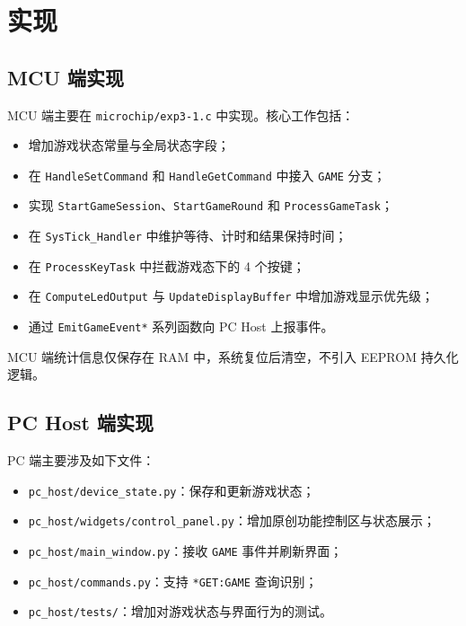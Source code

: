 \documentclass[main.tex]{subfiles}
\begin{document}
\section{实现}

\subsection{MCU 端实现}

MCU 端主要在 \texttt{microchip/exp3-1.c} 中实现。核心工作包括：

\begin{itemize}[leftmargin=2em]
  \item 增加游戏状态常量与全局状态字段；
  \item 在 \texttt{HandleSetCommand} 和 \texttt{HandleGetCommand} 中接入 \texttt{GAME} 分支；
  \item 实现 \texttt{StartGameSession}、\texttt{StartGameRound} 和 \texttt{ProcessGameTask}；
  \item 在 \texttt{SysTick\_Handler} 中维护等待、计时和结果保持时间；
  \item 在 \texttt{ProcessKeyTask} 中拦截游戏态下的 4 个按键；
  \item 在 \texttt{ComputeLedOutput} 与 \texttt{UpdateDisplayBuffer} 中增加游戏显示优先级；
  \item 通过 \texttt{EmitGameEvent*} 系列函数向 PC Host 上报事件。
\end{itemize}

MCU 端统计信息仅保存在 RAM 中，系统复位后清空，不引入 EEPROM 持久化逻辑。

\subsection{PC Host 端实现}

PC 端主要涉及如下文件：

\begin{itemize}[leftmargin=2em]
  \item \texttt{pc\_host/device\_state.py}：保存和更新游戏状态；
  \item \texttt{pc\_host/widgets/control\_panel.py}：增加原创功能控制区与状态展示；
  \item \texttt{pc\_host/main\_window.py}：接收 \texttt{GAME} 事件并刷新界面；
  \item \texttt{pc\_host/commands.py}：支持 \texttt{*GET:GAME} 查询识别；
  \item \texttt{pc\_host/tests/}：增加对游戏状态与界面行为的测试。
\end{itemize}
\end{document}
